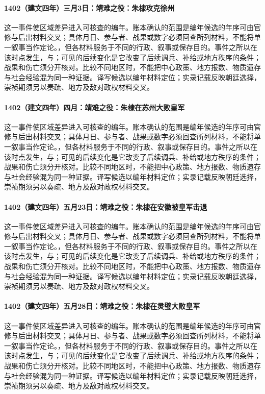\paragraph{1402（建文四年）三月3日：靖难之役：朱棣攻克徐州} 这一事件使区域差异进入可核查的编年。账本确认的范围是编年候选的年序可由官修与后出材料交叉；具体月日、参与者、战果或数字必须回查所列材料，不能将单一叙事当作定论。，但各材料服务于不同的行政、叙事或保存目的。事件之所以在该时点发生，与；可见的后续变化是它改变了后续调兵、补给或地方秩序的条件；战果和伤亡须分开核对。比较不同地区时，不能把中心政策、地方报数、物质遗存与社会经验混为同一种证据。译写候选以编年材料定位；实录记载反映朝廷选择，崇祯期须另以奏疏、地方及敌对政权材料交叉。

\paragraph{1402（建文四年）四月：靖难之役：朱棣在苏州大败皇军} 这一事件使区域差异进入可核查的编年。账本确认的范围是编年候选的年序可由官修与后出材料交叉；具体月日、参与者、战果或数字必须回查所列材料，不能将单一叙事当作定论。，但各材料服务于不同的行政、叙事或保存目的。事件之所以在该时点发生，与；可见的后续变化是它改变了后续调兵、补给或地方秩序的条件；战果和伤亡须分开核对。比较不同地区时，不能把中心政策、地方报数、物质遗存与社会经验混为同一种证据。译写候选以编年材料定位；实录记载反映朝廷选择，崇祯期须另以奏疏、地方及敌对政权材料交叉。

\paragraph{1402（建文四年）五月23日：靖难之役：朱棣在安徽被皇军击退} 这一事件使区域差异进入可核查的编年。账本确认的范围是编年候选的年序可由官修与后出材料交叉；具体月日、参与者、战果或数字必须回查所列材料，不能将单一叙事当作定论。，但各材料服务于不同的行政、叙事或保存目的。事件之所以在该时点发生，与；可见的后续变化是它改变了后续调兵、补给或地方秩序的条件；战果和伤亡须分开核对。比较不同地区时，不能把中心政策、地方报数、物质遗存与社会经验混为同一种证据。译写候选以编年材料定位；实录记载反映朝廷选择，崇祯期须另以奏疏、地方及敌对政权材料交叉。

\paragraph{1402（建文四年）五月28日：靖难之役：朱棣在灵璧大败皇军} 这一事件使区域差异进入可核查的编年。账本确认的范围是编年候选的年序可由官修与后出材料交叉；具体月日、参与者、战果或数字必须回查所列材料，不能将单一叙事当作定论。，但各材料服务于不同的行政、叙事或保存目的。事件之所以在该时点发生，与；可见的后续变化是它改变了后续调兵、补给或地方秩序的条件；战果和伤亡须分开核对。比较不同地区时，不能把中心政策、地方报数、物质遗存与社会经验混为同一种证据。译写候选以编年材料定位；实录记载反映朝廷选择，崇祯期须另以奏疏、地方及敌对政权材料交叉。

